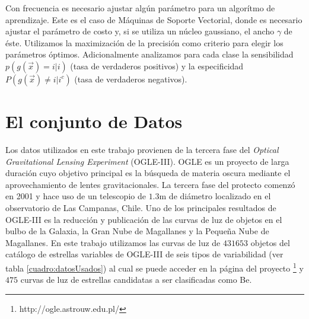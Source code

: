 \documentclass[letterpaper,12pt]{book}
\begin{document}
Con frecuencia es necesario ajustar algún parámetro para un algorítmo de aprendizaje. Este es el caso de Máquinas de Soporte Vectorial, donde es necesario ajustar el parámetro de costo y, si se utiliza un núcleo gaussiano, el ancho $\gamma$ de éste. Utilizamos la maximización de la precisión como criterio para elegir los parámetros óptimos. Adicionalmente analizamos para cada clase la sensibilidad $p(g(\vec{x})=i|i)$ (tasa de verdaderos positivos) y  la especificidad $P(g(\vec{x})\neq i|i^c)$ (tasa de verdaderos negativos).





\section{El conjunto de Datos\label{cap:losDatos}}

Los datos utilizados en este trabajo provienen de la tercera fase del \textit{Optical Gravitational Lensing Experiment} (OGLE-III). OGLE es un proyecto de larga duración cuyo objetivo principal es  la búsqueda de materia oscura mediante el aprovechamiento de lentes gravitacionales. La tercera fase del protecto comenzó en 2001 y hace uso de un telescopio de $1.3$m de diámetro localizado en el observatorio de Las Campanas, Chile\cite{udalski_optical_2004}. Uno de los principales resultados de OGLE-III es la reducción y publicación \cite{udalski_optical_2008} de las curvas de luz de objetos en el bulbo de la Galaxia, la Gran Nube de Magallanes y la Pequeña Nube de Magallanes. En este trabajo utilizamos las curvas de luz de $431 653$ objetos del catálogo de estrellas variables de OGLE-III de seis tipos de variabilidad (ver tabla \ref{cuadro:datosUsados}) al cual se puede acceder en la página del proyecto \footnote{http://ogle.astrouw.edu.pl/} y $475$ curvas de luz de estrellas candidatas a ser clasificadas como Be.
\end{document}

